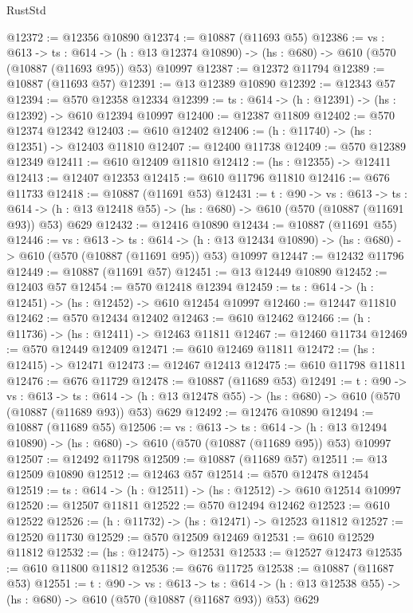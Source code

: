 \begin{lexlean}{RustStd}
\begin{coremodule}
@12372 := @12356 @10890
@12374 := @10887 (@11693 @55)
@12386 := {vs : @613} ->
  {ts : @614} ->
  (h : @13 @12374 @10890) -> (hs : @680) -> @610 (@570 (@10887 (@11693 @95)) @53) @10997
@12387 := @12372 @11794
@12389 := @10887 (@11693 @57)
@12391 := @13 @12389 @10890
@12392 := @12343 @57
@12394 := @570 @12358 @12334
@12399 := {ts : @614} -> (h : @12391) -> (hs : @12392) -> @610 @12394 @10997
@12400 := @12387 @11809
@12402 := @570 @12374 @12342
@12403 := @610 @12402
@12406 := (h : @11740) -> (hs : @12351) -> @12403 @11810
@12407 := @12400 @11738
@12409 := @570 @12389 @12349
@12411 := @610 @12409 @11810
@12412 := (hs : @12355) -> @12411
@12413 := @12407 @12353
@12415 := @610 @11796 @11810
@12416 := @676 @11733
@12418 := @10887 (@11691 @53)
@12431 := {t : @90} ->
  {vs : @613} ->
  {ts : @614} -> (h : @13 @12418 @55) -> (hs : @680) -> @610 (@570 (@10887 (@11691 @93)) @53) @629
@12432 := @12416 @10890
@12434 := @10887 (@11691 @55)
@12446 := {vs : @613} ->
  {ts : @614} ->
  (h : @13 @12434 @10890) -> (hs : @680) -> @610 (@570 (@10887 (@11691 @95)) @53) @10997
@12447 := @12432 @11796
@12449 := @10887 (@11691 @57)
@12451 := @13 @12449 @10890
@12452 := @12403 @57
@12454 := @570 @12418 @12394
@12459 := {ts : @614} -> (h : @12451) -> (hs : @12452) -> @610 @12454 @10997
@12460 := @12447 @11810
@12462 := @570 @12434 @12402
@12463 := @610 @12462
@12466 := (h : @11736) -> (hs : @12411) -> @12463 @11811
@12467 := @12460 @11734
@12469 := @570 @12449 @12409
@12471 := @610 @12469 @11811
@12472 := (hs : @12415) -> @12471
@12473 := @12467 @12413
@12475 := @610 @11798 @11811
@12476 := @676 @11729
@12478 := @10887 (@11689 @53)
@12491 := {t : @90} ->
  {vs : @613} ->
  {ts : @614} -> (h : @13 @12478 @55) -> (hs : @680) -> @610 (@570 (@10887 (@11689 @93)) @53) @629
@12492 := @12476 @10890
@12494 := @10887 (@11689 @55)
@12506 := {vs : @613} ->
  {ts : @614} ->
  (h : @13 @12494 @10890) -> (hs : @680) -> @610 (@570 (@10887 (@11689 @95)) @53) @10997
@12507 := @12492 @11798
@12509 := @10887 (@11689 @57)
@12511 := @13 @12509 @10890
@12512 := @12463 @57
@12514 := @570 @12478 @12454
@12519 := {ts : @614} -> (h : @12511) -> (hs : @12512) -> @610 @12514 @10997
@12520 := @12507 @11811
@12522 := @570 @12494 @12462
@12523 := @610 @12522
@12526 := (h : @11732) -> (hs : @12471) -> @12523 @11812
@12527 := @12520 @11730
@12529 := @570 @12509 @12469
@12531 := @610 @12529 @11812
@12532 := (hs : @12475) -> @12531
@12533 := @12527 @12473
@12535 := @610 @11800 @11812
@12536 := @676 @11725
@12538 := @10887 (@11687 @53)
@12551 := {t : @90} ->
  {vs : @613} ->
  {ts : @614} -> (h : @13 @12538 @55) -> (hs : @680) -> @610 (@570 (@10887 (@11687 @93)) @53) @629

\end{coremodule}
\end{lexlean}
